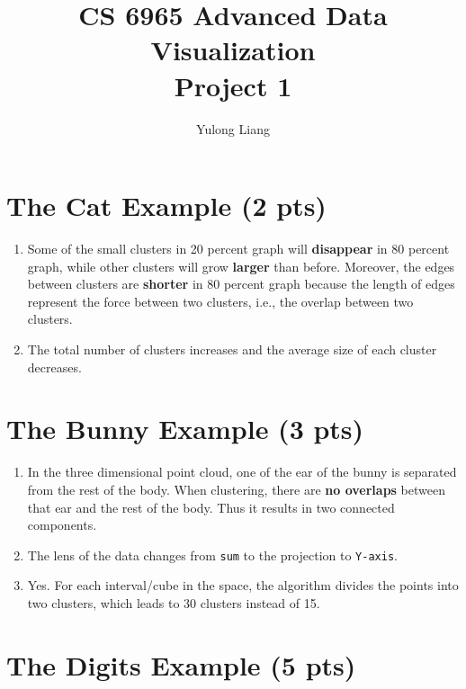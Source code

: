 \documentclass[12pt]{article}
\begin{document}
\title{CS 6965 Advanced Data Visualization\\{\bf Project 1}}
\author{Yulong Liang}
\maketitle

\setcounter{section}{1}
\section{The Cat Example (2 pts)}

\begin{enumerate}[label={\bfseries Q\arabic*:}]
\item Some of the small clusters in 20 percent graph will \textbf{disappear} in 80 percent graph, while other clusters will grow \textbf{larger} than before. Moreover, the edges between clusters are \textbf{shorter} in 80 percent graph because the length of edges represent the force between two clusters, i.e., the overlap between two clusters.
\item The total number of clusters increases and the average size of each cluster decreases.
\end{enumerate}

\section{The Bunny Example (3 pts)}

\begin{enumerate}[start=3, label={\bfseries Q\arabic*:}]
\item In the three dimensional point cloud, one of the ear of the bunny is separated from the rest of the body. When clustering, there are \textbf{no overlaps} between that ear and the rest of the body. Thus it results in two connected components.
\item The lens of the data changes from \texttt{sum} to the projection to \texttt{Y-axis}.
\item Yes. For each interval/cube in the space, the algorithm divides the points into two clusters, which leads to 30 clusters instead of 15.
\end{enumerate}

\section{The Digits Example (5 pts)}
\end{document}
